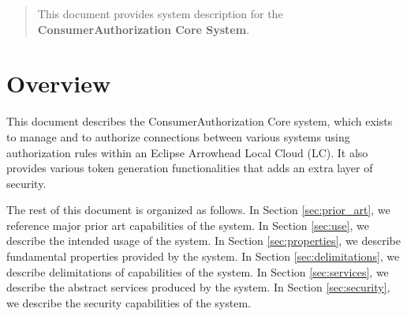 \documentclass[a4paper]{arrowhead}
\begin{document}
\ArrowheadDate{\today}
\ArrowheadSetup

\begin{center}
  \vspace*{1cm}
  \huge{\arrowtitle}

  \vspace*{0.2cm}
  \LARGE{\arrowtype}
  \vspace*{1cm}

  \vspace*{\fill}


  \vspace*{1cm}
  \vspace*{\fill}

  \begin{abstract}
    This document provides system description for the \textbf{ConsumerAuthorization Core System}.
  \end{abstract}

  \vspace*{1cm}

 \end{center}

\newpage

\tableofcontents
\newpage

\section{Overview}
\label{sec:overview}
\color{black}
This document describes the ConsumerAuthorization Core system, which exists to manage and to authorize connections between various systems using authorization rules within an Eclipse Arrowhead Local Cloud (LC). It also provides various token generation functionalities that adds an extra layer of security. 

The rest of this document is organized as follows.
In Section \ref{sec:prior_art}, we reference major prior art capabilities
of the system.
In Section \ref{sec:use}, we describe the intended usage of the system.
In Section \ref{sec:properties}, we describe fundamental properties
provided by the system.
In Section \ref{sec:delimitations}, we describe delimitations of capabilities
of the system.
In Section \ref{sec:services}, we describe the abstract services produced by the system.
In Section \ref{sec:security}, we describe the security capabilities
of the system.
\end{document}
